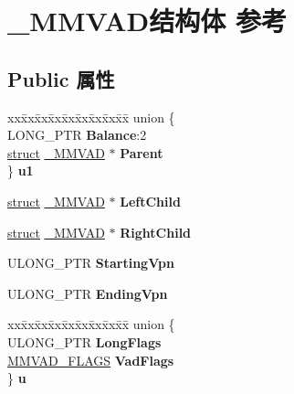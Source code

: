 \hypertarget{struct___m_m_v_a_d}{}\section{\+\_\+\+M\+M\+V\+A\+D结构体 参考}
\label{struct___m_m_v_a_d}
\subsection*{Public 属性}
\begin{DoxyCompactItemize}
\item 
\mbox{\label{struct___m_m_v_a_d_a94af1e073c3442c9f877bcd38e2877eb}} 
\begin{tabbing}
xx\=xx\=xx\=xx\=xx\=xx\=xx\=xx\=xx\=\kill
union \{\\
\>LONG\_PTR {\bfseries Balance}:2\\
\>\hyperlink{interfacestruct}{struct} \hyperlink{struct___m_m_v_a_d}{\_MMVAD} $\ast$ {\bfseries Parent}\\
\} {\bfseries u1}\\

\end{tabbing}\item 
\mbox{\label{struct___m_m_v_a_d_a29f8b58a1023e50ddccf15a289ceef77}} 
\hyperlink{interfacestruct}{struct} \hyperlink{struct___m_m_v_a_d}{\+\_\+\+M\+M\+V\+AD} $\ast$ {\bfseries Left\+Child}
\item 
\mbox{\label{struct___m_m_v_a_d_a1a8e7b3d959c6718069c4d927859def5}} 
\hyperlink{interfacestruct}{struct} \hyperlink{struct___m_m_v_a_d}{\+\_\+\+M\+M\+V\+AD} $\ast$ {\bfseries Right\+Child}
\item 
\mbox{\label{struct___m_m_v_a_d_aa15cd7f3cfad2dde5e9d717d65299ff9}} 
U\+L\+O\+N\+G\+\_\+\+P\+TR {\bfseries Starting\+Vpn}
\item 
\mbox{\label{struct___m_m_v_a_d_a2dd7dd62362f076b679598b10b82b623}} 
U\+L\+O\+N\+G\+\_\+\+P\+TR {\bfseries Ending\+Vpn}
\item 
\mbox{\label{struct___m_m_v_a_d_a0a78b90c10ef2ca16c3a69d5836bfa92}} 
\begin{tabbing}
xx\=xx\=xx\=xx\=xx\=xx\=xx\=xx\=xx\=\kill
union \{\\
\>ULONG\_PTR {\bfseries LongFlags}\\
\>\hyperlink{struct___m_m_v_a_d___f_l_a_g_s}{MMVAD\_FLAGS} {\bfseries VadFlags}\\
\} {\bfseries u}\\


\end{tabbing}
\end{DoxyCompactItemize}
